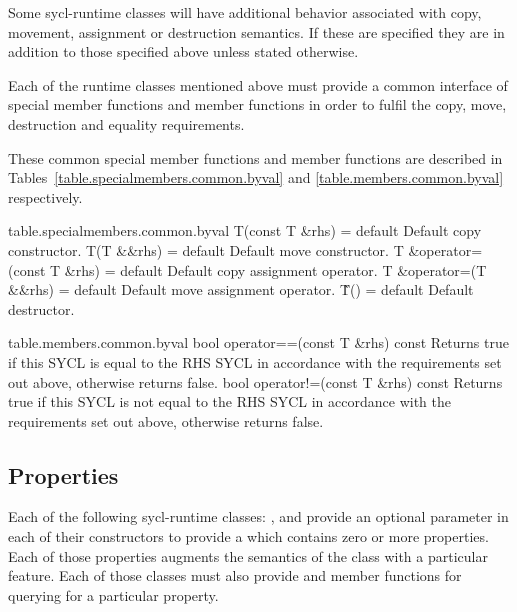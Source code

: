 Some \gls{sycl-runtime} classes will have additional behavior associated with copy, movement, assignment or destruction semantics. If these are specified they are in addition to those specified above unless stated otherwise.

Each of the runtime classes mentioned above must provide a common interface of special member functions and member functions in order to fulfil the copy, move, destruction and equality requirements.

These common special member functions and member functions are described in Tables~\ref{table.specialmembers.common.byval} and \ref{table.members.common.byval} respectively.



{table.specialmembers.common.byval}
  \addRow
    {T(const T \&rhs) = default}
    {
      Default copy constructor.  
    }
  \addRow
    {T(T \&\&rhs) = default}
    {
      Default move constructor.
    }  
   \addRow
   {T \&operator=(const T \&rhs) = default}
   {
     Default copy assignment operator.
   }
   \addRow
   {T \&operator=(T \&\&rhs) = default}
   {
     Default move assignment operator.
   }
   \addRow
   {\~T() = default}
   {
     Default destructor.
   }
\completeTable

{table.members.common.byval}
   \addRow
   {bool operator==(const T \&rhs) const}
   {
     Returns true if this SYCL  is equal to the RHS SYCL  in accordance with the requirements set out above, otherwise returns false.
   }
   \addRow
   {bool operator!=(const T \&rhs) const}
   {
     Returns true if this SYCL  is not equal to the RHS SYCL  in accordance with the requirements set out above, otherwise returns false.
   }
\completeTable

\subsection{Properties}

Each of the following \gls{sycl-runtime} classes: ,  and  provide an optional parameter in each of their constructors to provide a  which contains zero or more properties. Each of those properties augments the semantics of the class with a particular feature. Each of those classes must also provide  and  member functions for querying for a particular property.

